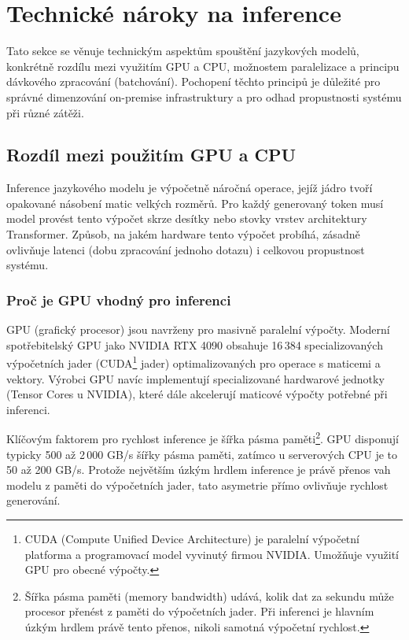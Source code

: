\section{Technické nároky na inference}
\label{sec:selection-technical}

Tato sekce se věnuje technickým aspektům spouštění jazykových modelů, konkrétně rozdílu mezi využitím GPU a CPU, možnostem paralelizace a principu dávkového zpracování (batchování).
Pochopení těchto principů je důležité pro správné dimenzování on-premise infrastruktury a pro odhad propustnosti systému při různé zátěži.

\subsection{Rozdíl mezi použitím GPU a CPU}
\label{subsec:technical-gpu-vs-cpu}

Inference jazykového modelu je výpočetně náročná operace, jejíž jádro tvoří opakované násobení matic velkých rozměrů.
Pro každý generovaný token musí model provést tento výpočet skrze desítky nebo stovky vrstev architektury Transformer.
Způsob, na jakém hardware tento výpočet probíhá, zásadně ovlivňuje latenci (dobu zpracování jednoho dotazu) i celkovou propustnost systému.

\subsubsection*{Proč je GPU vhodný pro inferenci}

GPU (grafický procesor) jsou navrženy pro masivně paralelní výpočty.
Moderní spotřebitelský GPU jako NVIDIA RTX 4090 obsahuje 16\,384 specializovaných výpočetních jader (CUDA\footnote{CUDA (Compute Unified Device Architecture) je paralelní výpočetní platforma a programovací model vyvinutý firmou NVIDIA. Umožňuje využití GPU pro obecné výpočty.} jader) optimalizovaných pro operace s maticemi a vektory.
Výrobci GPU navíc implementují specializované hardwarové jednotky (Tensor Cores u NVIDIA), které dále akcelerují maticové výpočty potřebné při inferenci.

Klíčovým faktorem pro rychlost inference je šířka pásma paměti\footnote{Šířka pásma paměti (memory bandwidth) udává, kolik dat za sekundu může procesor přenést z paměti do výpočetních jader. Při inferenci je hlavním úzkým hrdlem právě tento přenos, nikoli samotná výpočetní rychlost.}.
GPU disponují typicky 500 až 2\,000 GB/s šířky pásma paměti, zatímco u serverových CPU je to 50 až 200 GB/s.
Protože největším úzkým hrdlem inference je právě přenos vah modelu z paměti do výpočetních jader, tato asymetrie přímo ovlivňuje rychlost generování.

